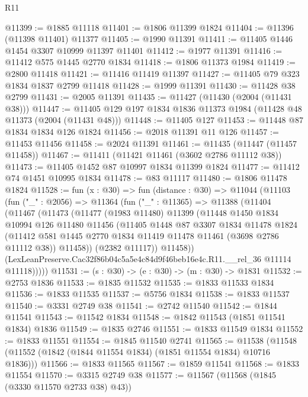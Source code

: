 \begin{lexlean}{R11}
\begin{coremodule}
@11399 := @1885 @11118
@11401 := @1806 @11399 @1824
@11404 := @11396 (@11398 @11401) @11377
@11405 := @1990 @11391
@11411 := @11405 @1446 @1454 @3307 @10999 @11397 @11401
@11412 := @1977 @11391
@11416 := @11412 @575 @1445 @2770 @1834
@11418 := @1806 @11373 @1984
@11419 := @2800 @11418
@11421 := @11416 @11419 @11397
@11427 := @11405 @79 @323 @1834 @1837 @2799 @11418
@11428 := @1999 @11391
@11430 := @11428 @38 @2799
@11431 := @2005 @11391
@11435 := @11427 (@11430 (@2004 (@11431 @38)))
@11447 := @11405 @129 @197 @1834 @1836 @11373 @1984 (@11428 @48 @11373 (@2004 (@11431 @48)))
@11448 := @11405 @127
@11453 := @11448 @87 @1834 @1834 @126 @1824
@11456 := @2018 @11391 @11 @126
@11457 := @11453 @11456
@11458 := @2024 @11391
@11461 := @11435 (@11447 (@11457 @11458))
@11467 := @11411 (@11421 @11461 (@3602 @2786 @11112 @38))
@11473 := @11405 @1452 @87 @10997 @1834 @11399 @1824
@11477 := @11412 @74 @1451 @10995 @1834
@11478 := @83 @11117
@11480 := @1806 @11478 @1824
@11528 := fun (x : @30) =>
  fun (distance : @30) =>
  @11044
    (@11103
      (fun ("_" : @2056) =>
      @11364
        (fun ("_" : @11365) =>
        @11388
          (@11404
            (@11467
              (@11473
                (@11477
                  (@1983 @11480)
                  @11399
                  (@11448
                    @1450
                    @1834
                    @10994
                    @126
                    @11480
                    @11456
                    (@11405
                      @1448
                      @87
                      @3307
                      @1834
                      @11478
                      @1824
                      (@11412 @581 @1445 @2770 @1834 @11419 @11478 @11461 (@3698 @2786 @11112 @38))
                      @11458))
                  (@2382 @11117))
                @11458))
            (LexLeanPreserve.Cac32f86b04c5a5e4c84d9f46beb16e4c.R11.__rel_36 @11114 @11118)))))
@11531 := (s : @30) -> (e : @30) -> (m : @30) -> @1831
@11532 := @2753 @1836
@11533 := @1835 @11532
@11535 := @1833 @11533 @1834
@11536 := @1833 @11535
@11537 := @5756 @1834
@11538 := @1833 @11537
@11540 := @3331 @2749 @38
@11541 := @2742 @11540
@11542 := @1844 @11541
@11543 := @11542 @1834
@11548 := @1842 @11543 (@1851 @11541 @1834) @1836
@11549 := @1835 @2746
@11551 := @1833 @11549 @1834
@11552 := @1833 @11551
@11554 := @1845 @11540 @2741
@11565 := @11538 (@11548 (@11552 (@1842 (@1844 @11554 @1834) (@1851 @11554 @1834) @10716 @1836)))
@11566 := @1833 @11565
@11567 := @1859 @11541
@11568 := @1833 @11554
@11570 := @3315 @2749 @38
@11577 := @11567 (@11568 (@1845 (@3330 @11570 @2733 @38) @43))

\end{coremodule}
\end{lexlean}
